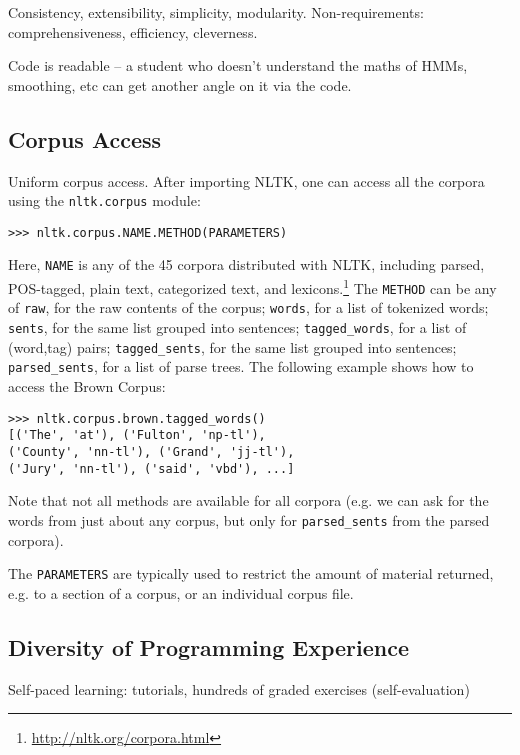 \documentclass[11pt]{article}
\begin{document}
Consistency, extensibility, simplicity, modularity.
Non-requirements: comprehensiveness, efficiency, cleverness.
\cite{LoperBird02}

Code is readable -- a student who doesn't understand the maths of HMMs,
smoothing, etc can get another angle on it via the code.

\subsection{Corpus Access}

Uniform corpus access.  After importing NLTK, one can access all the corpora
using the \texttt{nltk.corpus} module:

{\small\begin{verbatim}
>>> nltk.corpus.NAME.METHOD(PARAMETERS)
\end{verbatim}}

Here, \texttt{NAME} is any of the 45 corpora distributed with NLTK, including
parsed, POS-tagged, plain text, categorized text, and lexicons.\footnote{\url{http://nltk.org/corpora.html}}
The \texttt{METHOD} can be any of
\texttt{raw}, for the raw contents of the corpus;
\texttt{words}, for a list of tokenized words;
\texttt{sents}, for the same list grouped into sentences;
\texttt{tagged\_words}, for a list of (word,tag) pairs;
\texttt{tagged\_sents}, for the same list grouped into sentences;
\texttt{parsed\_sents}, for a list of parse trees.
The following example shows how to access the Brown Corpus:

{\small\begin{verbatim}
>>> nltk.corpus.brown.tagged_words()
[('The', 'at'), ('Fulton', 'np-tl'),
('County', 'nn-tl'), ('Grand', 'jj-tl'),
('Jury', 'nn-tl'), ('said', 'vbd'), ...]
\end{verbatim}}

Note that not all methods are available for all corpora (e.g. we can
ask for the words from just about any corpus, but only for
\texttt{parsed\_sents} from the parsed corpora).

The \texttt{PARAMETERS} are typically used to restrict the amount of material returned,
e.g. to a section of a corpus, or an individual corpus file.

\subsection{Diversity of Programming Experience}

Self-paced learning: tutorials, hundreds of graded exercises (self-evaluation)
\end{document}
